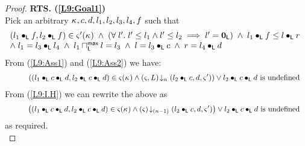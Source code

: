 \begin{lemma}[]
\begin{proof}
\noindent\textbf{RTS. (\ref{L9:Goal1})}\\
Pick an arbitrary $\kappa_{}, c, d, l_1, l_2, l_3, l_4, f$ such that
%
\begin{equation}
\hspace*{-0.15cm}
\begin{array}{l}
	(l_1 \composeL f, l_2 \composeL f) \in \amod{}'(\ca{}) \;\land\; 
	\left(\for{l'} l' \leq l_1 \land l' \leq l_2 \implies l' = \unitL \right)
	\;\land\; l_1 \composeL f \leq l \composeL r\\
%
	\land\; l_1 = l_3 \composeL l_4 \;\land\; 	l_1 \maxMeetL l = l_3 \;\land\; l = l_3 \composeL c \;\land\; r = l_4 \composeL d
\end{array} \label{L9:Ass2}
\end{equation}
%
From (\ref{L9:Ass1}) and (\ref{L9:Ass2}) we have:
%
\begin{align}
	&\hspace*{1cm} \left((l_1 \bullet_{\textsf{L}} c \bullet_{\textsf{L}} d, l_2 \bullet_{\textsf{L}} c \bullet_{\textsf{L}} d) \in \varsigma_{}(\kappa_{}) \land
	\left(\varsigma_{}, L\right) \!\downarrow_{n} \left(l_2 \bullet_{\textsf{L}} c, d, \varsigma_{}'\right)\right) \lor l_2 \bullet_{\textsf{L}} c \bullet_{\textsf{L}} d \text{ is undefined} \nonumber
\end{align}
%
From (\ref{L9:I.H}) we can rewrite the above as 
%
\begin{align}
	&\hspace*{1cm} \left((l_1 \bullet_{\textsf{L}} c \bullet_{\textsf{L}} d, l_2 \bullet_{\textsf{L}} c \bullet_{\textsf{L}} d) \in \varsigma_{}(\kappa_{}) \land
	\left(\varsigma_{}\right) \!\downarrow_{(n-1)} \left(l_2 \bullet_{\textsf{L}} c, d, \varsigma_{}'\right)\right) \lor l_2 \bullet_{\textsf{L}} c \bullet_{\textsf{L}} d \text{ is undefined} \label{L9:Ass3}
\end{align}
%
as required.\\


\end{proof}
\end{lemma}

